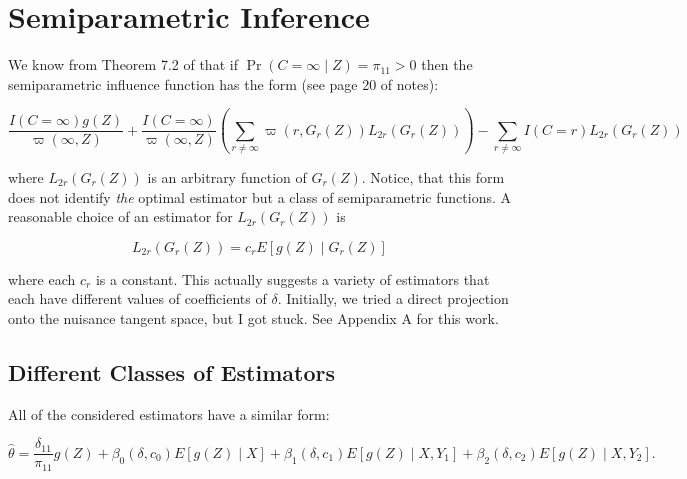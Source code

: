 \documentclass[12pt]{article}
\begin{document}
%

\section*{Semiparametric Inference}

We know from Theorem 7.2 of \cite{tsiatis2006semiparametric} that if $\Pr(C =
\infty \mid Z) = \pi_{11} > 0$ 
then the semiparametric influence function has the form (see page 20 of notes):

\begin{equation}\label{lambda2}
 \frac{I(C = \infty) g(Z)}{\varpi(\infty, Z)} + \frac{I(C =
  \infty)}{\varpi(\infty, Z)} \left(\sum_{r \neq \infty} \varpi(r, G_r(Z))
  L_{2r}(G_r(Z))\right) - \sum_{r \neq \infty} I(C = r)L_{2r}(G_r(Z))
\end{equation}

where $L_{2r}(G_r(Z))$ is an arbitrary function of $G_r(Z)$. Notice, that this
form does not identify \textit{the} optimal estimator but a class of 
semiparametric functions. A reasonable choice of an estimator for $L_{2r}(G_r(Z))$ is

\[L_{2r}(G_r(Z)) = c_r E[g(Z) \mid G_r(Z)]\]

where each $c_r$ is a constant. This actually suggests a variety of estimators 
that each have different values of coefficients of $\delta$. Initially, we tried 
a direct projection onto the nuisance tangent space, but I got stuck. See Appendix A 
for this work.

\subsection*{Different Classes of Estimators}

All of the considered estimators have a similar form:

\[\hat \theta = \frac{\delta_{11}}{\pi_{11}}g(Z) + \beta_0(\delta, c_0)E[g(Z)
\mid X] + \beta_1(\delta, c_1)E[g(Z) \mid X, Y_1] + \beta_2(\delta, c_2) E[g(Z)
\mid X, Y_2].\]
\end{document}
